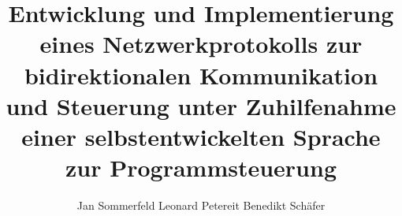 \documentclass[12pt,a4paper]{scrartcl}
\begin{document}
\title{Entwicklung und Implementierung eines Netzwerkprotokolls zur bidirektionalen Kommunikation und Steuerung unter Zuhilfenahme einer selbstentwickelten Sprache zur Programmsteuerung}
\author{Jan Sommerfeld Leonard Petereit Benedikt Schäfer}
\maketitle
\tableofcontents
\newpage



\newpage


\end{document}
